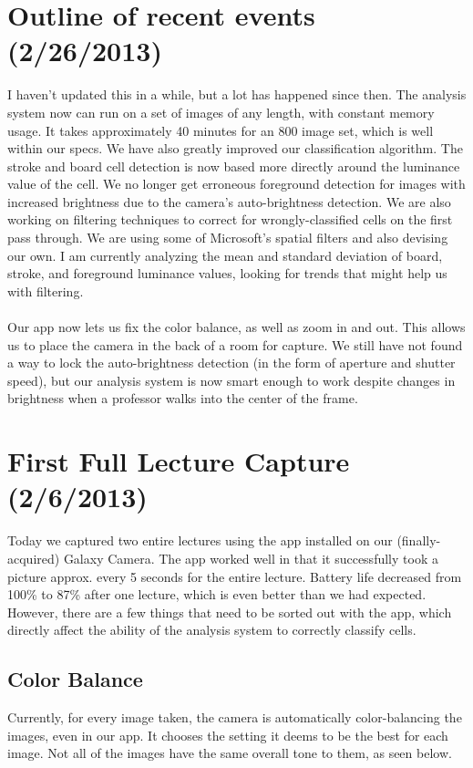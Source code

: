 \documentclass[]{article}
\begin{document}
	\section{Outline of recent events (2/26/2013)}
		I haven't updated this in a while, but a lot has happened since then.  The analysis system now can run on a set of images of any length, with constant memory usage.  It takes approximately 40 minutes for an 800 image set, which is well within our specs.  We have also greatly improved our classification algorithm.  The stroke and board cell detection is now based more directly around the luminance value of the cell.  We no longer get erroneous foreground detection for images with increased brightness due to the camera's auto-brightness detection.  We are also working on filtering techniques to correct for wrongly-classified cells on the first pass through.  We are using some of Microsoft's spatial filters and also devising our own.  I am currently analyzing the mean and standard deviation of board, stroke, and foreground luminance values, looking for trends that might help us with filtering.   \\ \\  Our app now lets us fix the color balance, as well as zoom in and out.  This allows us to place the camera in the back of a room for capture. We still have not found a way to lock the auto-brightness detection (in the form of aperture and shutter speed), but our analysis system is now smart enough to work despite changes in brightness when a professor walks into the center of the frame.
		
	\section{First Full Lecture Capture (2/6/2013)}
		Today we captured two entire lectures using the app installed on our (finally-acquired) Galaxy Camera.  The app worked well in that it successfully took a picture approx. every 5 seconds for the entire lecture.  Battery life decreased from 100\% to 87\% after one lecture, which is even better than we had expected.  However, there are a few things that need to be sorted out with the app, which directly affect the ability of the analysis system to correctly classify cells.  
		\subsection*{Color Balance}
		Currently, for every image taken, the camera is automatically color-balancing the images, even in our app.  It chooses the setting it deems to be the best for each image.  Not all of the images have the same overall tone  to them, as seen below.   \\
\end{document}
